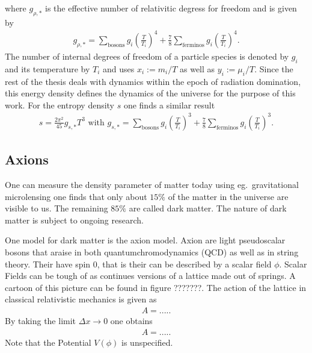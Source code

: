 \documentclass[a4paper, 12pt]{article}
\begin{document}
where $g_{\rho, *}$ is the effective number of relativitic degress for freedom and is given by
\begin{align}
    g_{\rho, *} = \sum_\mathrm{bosons} g_i \left( \frac{T}{T_i} \right)^4 + \frac{7}{8} \sum_\mathrm{ferminos} g_i \left( \frac{T}{T_i} \right)^4.
\end{align}
The number of internal degrees of freedom of a particle species is denoted by $g_i$ and its temperature by $T_i$ and uses $x_i := m_i / T$ as well as $y_i := \mu_i / T$.
Since the rest of the thesis deals with dynamics within the epoch of radiation domination, this energy density defines the
dynamics of the universe for the purpose of this work.
For the entropy density $s$ one finds a similar result \cite[Eq. 3.72, 3.73]{TheEarlyUniverseKolbAndTurner}
\begin{align}
    \label{eq:entropy_density}
    s = \frac{2 \pi^2}{45} g_{s, *} T^3 \, \, \mathrm{with} \, \,
     g_{s, *} = \sum_\mathrm{bosons} g_i \left( \frac{T}{T_i} \right)^3 + \frac{7}{8} \sum_\mathrm{ferminos} g_i \left( \frac{T}{T_i} \right)^3.
\end{align}


\noindent
\subsection{Axions}
One can measure the density parameter of matter today using eg.\
gravitational microlensing one finds that
only about $15\%$ of the matter in the universe are visible to us.
The remaining $85\%$ are called dark matter. The nature of dark matter is subject to ongoing research.

One model for dark matter is the axion model.
Axion are light pseudoscalar bosons that araise in both quantumchromodynamics (QCD)
as well as in string theory. Their have spin 0, that is their can be described
by a scalar field $\phi$.
Scalar Fields can be tough of as continues versions of a
lattice made out of springs. A cartoon of this picture can be found in figure ???????.
The action of the lattice in classical relativistic mechanics is given as
\begin{align}
    A = .....
\end{align}
By taking the limit $\Delta x \rightarrow 0$ one obtains
\begin{align}
    A = .....
\end{align}
Note that the Potential $V(\phi)$ is unspecified.
\end{document}
